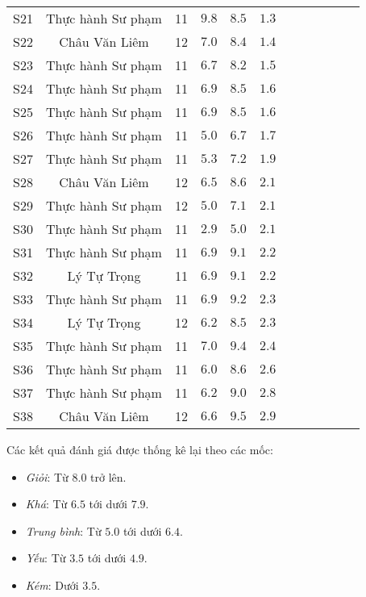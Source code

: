 \begin{longtable}{ScSlScScScSc}
	S21 & Thực hành Sư phạm & 11 & $9.8$ & $8.5$ & $1.3$ \\
	S22 & Châu Văn Liêm     & 12 & $7.0$ & $8.4$ & $1.4$ \\
	S23 & Thực hành Sư phạm & 11 & $6.7$ & $8.2$ & $1.5$ \\
	S24 & Thực hành Sư phạm & 11 & $6.9$ & $8.5$ & $1.6$ \\
	S25 & Thực hành Sư phạm & 11 & $6.9$ & $8.5$ & $1.6$ \\
	S26 & Thực hành Sư phạm & 11 & $5.0$ & $6.7$ & $1.7$ \\
	S27 & Thực hành Sư phạm & 11 & $5.3$ & $7.2$ & $1.9$ \\
	S28 & Châu Văn Liêm     & 12 & $6.5$ & $8.6$ & $2.1$ \\
	S29 & Thực hành Sư phạm & 12 & $5.0$ & $7.1$ & $2.1$ \\
	S30 & Thực hành Sư phạm & 11 & $2.9$ & $5.0$ & $2.1$ \\
	S31 & Thực hành Sư phạm & 11 & $6.9$ & $9.1$ & $2.2$ \\
	S32 & Lý Tự Trọng       & 11 & $6.9$ & $9.1$ & $2.2$ \\
	S33 & Thực hành Sư phạm & 11 & $6.9$ & $9.2$ & $2.3$ \\
	S34 & Lý Tự Trọng       & 12 & $6.2$ & $8.5$ & $2.3$ \\
	S35 & Thực hành Sư phạm & 11 & $7.0$ & $9.4$ & $2.4$ \\
	S36 & Thực hành Sư phạm & 11 & $6.0$ & $8.6$ & $2.6$ \\
	S37 & Thực hành Sư phạm & 11 & $6.2$ & $9.0$ & $2.8$ \\
	S38 & Châu Văn Liêm     & 12 & $6.6$ & $9.5$ & $2.9$ \\
\end{longtable}\par

Các kết quả đánh giá được thống kê lại theo các mốc: \begin{itemize}
	\item \textit{Giỏi}: Từ $8.0$ trở lên.
	\item \textit{Khá}: Từ $6.5$ tới dưới $7.9$.
	\item \textit{Trung bình}: Từ $5.0$ tới dưới $6.4$.
	\item \textit{Yếu}: Từ $3.5$ tới dưới $4.9$.
	\item \textit{Kém}: Dưới $3.5$.
\end{itemize}\par

